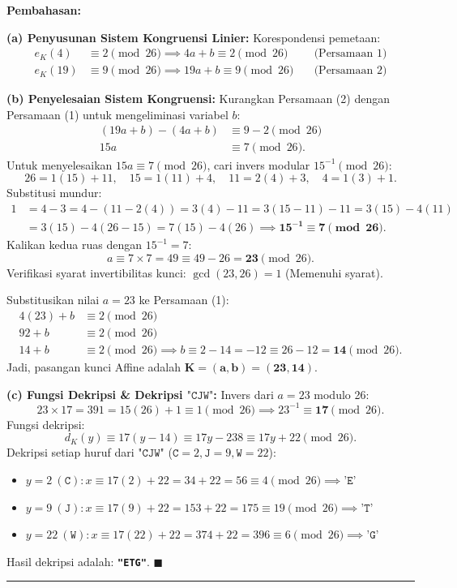 \documentclass[11pt,a4paper]{article}
\newenvironment{solusi}{\noindent\textbf{\textsf{Pembahasan:}}\par\vspace{0.2em}}{\hfill$\blacksquare$\vspace{1em}\par\hrule\vspace{1em}}
\begin{document}
\begin{solusi}
\textbf{(a) Penyusunan Sistem Kongruensi Linier:}
Korespondensi pemetaan:
\begin{align*}
e_K(4) &\equiv 2 \pmod{26} \implies 4a + b \equiv 2 \pmod{26} \quad &\text{(Persamaan 1)} \\
e_K(19) &\equiv 9 \pmod{26} \implies 19a + b \equiv 9 \pmod{26} \quad &\text{(Persamaan 2)}
\end{align*}

\vspace{0.2cm}
\textbf{(b) Penyelesaian Sistem Kongruensi:}
Kurangkan Persamaan (2) dengan Persamaan (1) untuk mengeliminasi variabel $b$:
\begin{align*}
(19a + b) - (4a + b) &\equiv 9 - 2 \pmod{26} \\
15a &\equiv 7 \pmod{26}.
\end{align*}
Untuk menyelesaikan $15a \equiv 7 \pmod{26}$, cari invers modular $15^{-1} \pmod{26}$:
\[
26 = 1(15) + 11, \quad 15 = 1(11) + 4, \quad 11 = 2(4) + 3, \quad 4 = 1(3) + 1.
\]
Substitusi mundur:
\begin{align*}
1 &= 4 - 3 = 4 - (11 - 2(4)) = 3(4) - 11 = 3(15 - 11) - 11 = 3(15) - 4(11) \\
&= 3(15) - 4(26 - 15) = 7(15) - 4(26) \implies \mathbf{15^{-1} \equiv 7 \pmod{26}}.
\end{align*}
Kalikan kedua ruas dengan $15^{-1} = 7$:
\[
a \equiv 7 \times 7 = 49 \equiv 49 - 26 = \mathbf{23} \pmod{26}.
\]
Verifikasi syarat invertibilitas kunci: $\gcd(23, 26) = 1$ (Memenuhi syarat).

Substitusikan nilai $a = 23$ ke Persamaan (1):
\begin{align*}
4(23) + b &\equiv 2 \pmod{26} \\
92 + b &\equiv 2 \pmod{26} \\
14 + b &\equiv 2 \pmod{26} \implies b \equiv 2 - 14 = -12 \equiv 26 - 12 = \mathbf{14} \pmod{26}.
\end{align*}
Jadi, pasangan kunci Affine adalah $\mathbf{K = (a, b) = (23, 14)}$.

\vspace{0.2cm}
\textbf{(c) Fungsi Dekripsi \& Dekripsi $\texttt{"CJW"}$:}
Invers dari $a = 23$ modulo 26:
\[
23 \times 17 = 391 = 15(26) + 1 \equiv 1 \pmod{26} \implies 23^{-1} \equiv \mathbf{17} \pmod{26}.
\]
Fungsi dekripsi:
\[
d_K(y) \equiv 17(y - 14) \equiv 17y - 238 \equiv 17y + 22 \pmod{26}.
\]
Dekripsi setiap huruf dari $\texttt{"CJW"}$ ($\texttt{C}=2, \texttt{J}=9, \texttt{W}=22$):
\begin{itemize}
    \item $y = 2 \ (\texttt{C}): x \equiv 17(2) + 22 = 34 + 22 = 56 \equiv 4 \pmod{26} \implies \mathbf{\texttt{'E'}}$
    \item $y = 9 \ (\texttt{J}): x \equiv 17(9) + 22 = 153 + 22 = 175 \equiv 19 \pmod{26} \implies \mathbf{\texttt{'T'}}$
    \item $y = 22 \ (\texttt{W}): x \equiv 17(22) + 22 = 374 + 22 = 396 \equiv 6 \pmod{26} \implies \mathbf{\texttt{'G'}}$
\end{itemize}
Hasil dekripsi adalah: \textbf{\texttt{"ETG"}}.
\end{solusi}
\end{document}
